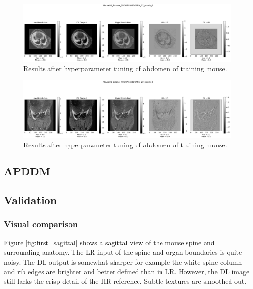 \documentclass[twocolumn]{article}
\begin{document}
\begin{figure}
    \centering
    \includegraphics[width=1\linewidth]{Mouse01_Transax_THORAX-ABDOMEN_27_epoch_0.png}
    \caption{Results after hyperparameter tuning of abdomen of training mouse.}
    \label{fig:second_transax}
\end{figure}

\begin{figure}
    \centering
    \includegraphics[width=1\linewidth]{Mouse01_Coronal_THORAX-ABDOMEN_20_epoch_2.png}
    \caption{Results after hyperparameter tuning of abdomen of training mouse.}
    \label{fig:second_coronal}
\end{figure}
   

\subsection{APDDM}

\subsection{Validation}



\subsubsection{Visual comparison}
Figure \ref{fig:first_sagittal} shows a sagittal view of the mouse spine and surrounding anatomy. 
The LR input of the spine and organ boundaries is quite noisy. The DL output is somewhat sharper for example the white spine column and rib edges are brighter and better defined than in LR. 
However, the DL image still lacks the crisp detail of the HR reference. 
Subtle textures are smoothed out. 
\end{document}
